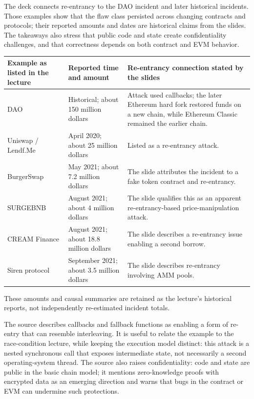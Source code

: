 \documentclass[11pt,a4paper]{article}
\numberwithin{figure}{section}
\begin{document}
The deck connects re-entrancy to the DAO incident and later historical incidents. Those examples show that the flaw class persisted across changing contracts and protocols; their reported amounts and dates are historical claims from the slides. The takeaways also stress that public code and state create confidentiality challenges, and that correctness depends on both contract and EVM behavior.

\begin{center}\small
\begin{tabularx}{\linewidth}{@{}p{41mm}p{28mm}Y@{}}\toprule
Example as listed in the lecture & Reported time and amount & Re-entrancy connection stated by the slides\\\midrule
DAO & Historical; about 150 million dollars & Attack used callbacks; the later Ethereum hard fork restored funds on a new chain, while Ethereum Classic remained the earlier chain.\\
Uniswap / Lendf.Me & April 2020; about 25 million dollars & Listed as a re-entrancy attack.\\
BurgerSwap & May 2021; about 7.2 million dollars & The slide attributes the incident to a fake token contract and re-entrancy.\\
SURGEBNB & August 2021; about 4 million dollars & The slide qualifies this as an apparent re-entrancy-based price-manipulation attack.\\
CREAM Finance & August 2021; about 18.8 million dollars & The slide describes a re-entrancy issue enabling a second borrow.\\
Siren protocol & September 2021; about 3.5 million dollars & The slide describes re-entrancy involving AMM pools.\\\bottomrule
\end{tabularx}\end{center}
These amounts and causal summaries are retained as the lecture's historical reports, not independently re-estimated incident totals.

The source describes callbacks and fallback functions as enabling a form of re-entry that can resemble interleaving. It is useful to relate the example to the race-condition lecture, while keeping the execution model distinct: this attack is a nested synchronous call that exposes intermediate state, not necessarily a second operating-system thread. The source also raises confidentiality: code and state are public in the basic chain model; it mentions zero-knowledge proofs with encrypted data as an emerging direction and warns that bugs in the contract or EVM can undermine such protections.
\end{document}
